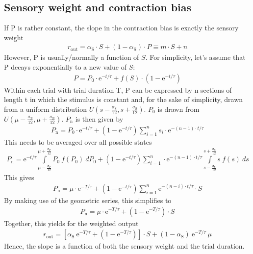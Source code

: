 \documentclass[10pt,a4paper,draft]{article}
\begin{document}
\subsection*{Sensory weight and contraction bias}
%
If P is rather constant, the slope in the contraction bias is exactly the sensory weight
%
 \begin{align*}
 r_\mathrm{out} = \alpha_\mathrm{S} \cdot S + \left( 1 -\alpha_\mathrm{S} \right) \cdot P \equiv m \cdot S + n
 \end{align*}
%
However, P is usually/normally a function of $S$. For simplicity, let's assume that P decays exponentially to a new value of $S$:
%
\begin{align*}
P = P_\mathrm{0} \cdot \mathrm{e}^{-t/\tau} + f(S) \cdot \left( 1 -   \mathrm{e}^{-t/\tau} \right)
\end{align*}
%
Within each trial with trial duration T, P can be expressed by n sections of length t in which the stimulus is constant and, for the sake of simplicity, drawn from a uniform distribution $U\left( s - \frac{\sigma_\mathrm{S}}{12}, s + \frac{\sigma_\mathrm{S}}{12} \right)$. $P_\mathrm{0}$ is drawn from $U\left( \mu - \frac{\sigma_\mathrm{P}}{12}, \mu + \frac{\sigma_\mathrm{P}}{12} \right)$. $P_\mathrm{n}$ is then given by
%
\begin{align*}
P_\mathrm{n} = P_\mathrm{0} \cdot \mathrm{e}^{-t/\tau}  + \left( 1 -   \mathrm{e}^{-t/\tau} \right) \sum_{i=1}^{n} s_i \cdot \mathrm{e}^{-(n-1)\cdot t/ \tau}
\end{align*}
%
This needs to be averaged over all possible states
%
\begin{align*}
P_\mathrm{n} = \mathrm{e}^{-t/\tau}  \int\limits_{\mu - \frac{\sigma_\mathrm{P}}{12}}^{\mu + \frac{\sigma_\mathrm{P}}{12}} P_\mathrm{0} \ f(P_\mathrm{0})\ dP_0+ \left( 1 -   \mathrm{e}^{-t/\tau} \right) \sum_{i=1}^{n} \cdot \mathrm{e}^{-(n-1)\cdot t/ \tau} \int\limits_{s - \frac{\sigma_\mathrm{S}}{12}}^{s + \frac{\sigma_\mathrm{S}}{12}} s\ f(s)\ ds
\end{align*}
%
This gives
%
\begin{align*}
P_\mathrm{n} = \mu \cdot \mathrm{e}^{-T/\tau} + \left( 1 -   \mathrm{e}^{-t/\tau} \right) \sum_{i=1}^{n} \mathrm{e}^{-(n-i)\cdot t/ \tau} \cdot S
\end{align*}
%
By making use of the geometric series, this simplifies to
%
\begin{align*}
P_\mathrm{n} =  \mu \cdot \mathrm{e}^{-T/\tau} + \left( 1 -   \mathrm{e}^{-T/\tau} \right) \cdot S
\end{align*}
%
Together, this yields for the weighted output
%
\begin{align*}
 r_\mathrm{out} = \left[ \alpha_\mathrm{S}\  \mathrm{e}^{-T/\tau} + \left( 1 -   \mathrm{e}^{-T/\tau} \right)\right] \cdot S + \left( 1 -\alpha_\mathrm{S} \right)\ \mathrm{e}^{-T/\tau}\ \mu
\end{align*}
%
Hence, the slope is a function of both the sensory weight and the trial duration. 
 
\end{document}
